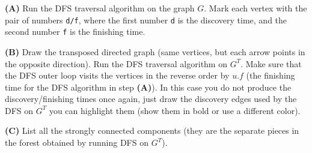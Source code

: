 \documentclass[a4paper,12pt]{article}
\begin{document}
\vspace{10pt}
{\bf (A)} Run the DFS traversal algorithm on the graph $G$. 
Mark each vertex 
with the pair of numbers {\tt d/f}, where the first number {\tt d} is the 
discovery time, and the second number {\tt f} is the finishing time. 

\vspace{10pt}
{\bf (B)} Draw the transposed directed graph (same vertices, but each arrow points
in the opposite direction). 
Run the DFS traversal algorithm on $G^T$. Make sure that the DFS 
outer loop visits the vertices in the reverse order by $u.f$ 
(the finishing time for the DFS algorithm in step {\bf (A)}). 
In this case you do not produce the discovery/finishing times once again, 
just draw the discovery edges used by the DFS on $G^T$ \textendash{}
you can highlight them (show them in bold or use a different color). 

\vspace{10pt}
{\bf (C)} List all the strongly connected components (they are 
the separate pieces in the forest obtained by running DFS 
on $G^T$). 
\end{document}
